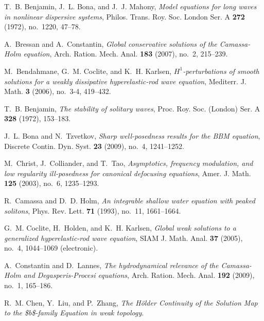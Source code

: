 \documentclass[12pt,reqno]{amsbook}
\numberwithin{section}{chapter}
\numberwithin{equation}{section}  %
\theoremstyle{remark}
\begin{document}
\begin{thebibliography}{HIKK10}

T.~B. Benjamin, J.~L. Bona, and J.~J. Mahony, \emph{{Model equations for long
  waves in nonlinear dispersive systems}}, Philos. Trans. Roy. Soc. London Ser.
  A \textbf{272} (1972), no.~1220, 47--78.

A.~Bressan and A.~Constantin, \emph{{Global conservative solutions of the
  Camassa-Holm equation}}, Arch. Ration. Mech. Anal. \textbf{183} (2007),
  no.~2, 215--239.

M.~Bendahmane, G.~M. Coclite, and K.~H. Karlsen,
  \emph{$H^1$-perturbations of smooth solutions for a weakly dissipative
  hyperelastic-rod wave equation}, Mediterr. J. Math. \textbf{3} (2006),
  no.~3-4, 419--432.

T.~B. Benjamin, \emph{{The stability of solitary waves}}, Proc. Roy. Soc.
  (London) Ser. A \textbf{328} (1972), 153--183.

J.~L. Bona and N.~Tzvetkov, \emph{{Sharp well-posedness results for the BBM
  equation}}, Discrete Contin. Dyn. Syst. \textbf{23} (2009), no.~4,
  1241--1252.

M.~Christ, J.~Colliander, and T.~Tao, \emph{{Asymptotics, frequency modulation,
  and low regularity ill-posedness for canonical defocusing equations}}, Amer.
  J. Math. \textbf{125} (2003), no.~6, 1235--1293.

R.~Camassa and D.~D. Holm, \emph{{An integrable shallow water equation with
  peaked solitons}}, Phys. Rev. Lett. \textbf{71} (1993), no.~11, 1661--1664.

G.~M. Coclite, H.~Holden, and K.~H. Karlsen, \emph{{Global weak solutions to a
  generalized hyperelastic-rod wave equation}}, SIAM J. Math. Anal. \textbf{37}
  (2005), no.~4, 1044--1069 (electronic).

A.~Constantin and D.~Lannes, \emph{{The hydrodynamical relevance of the
  Camassa-Holm and Degasperis-Procesi equations}}, Arch. Ration. Mech. Anal.
  \textbf{192} (2009), no.~1, 165--186.

R.~M. Chen, Y.~Liu, and P.~Zhang, \emph{{The H{\"o}lder Continuity of the
  Solution Map to the {\$}b{\$}-family Equation in weak topology}}.


\end{thebibliography}
\end{document}
